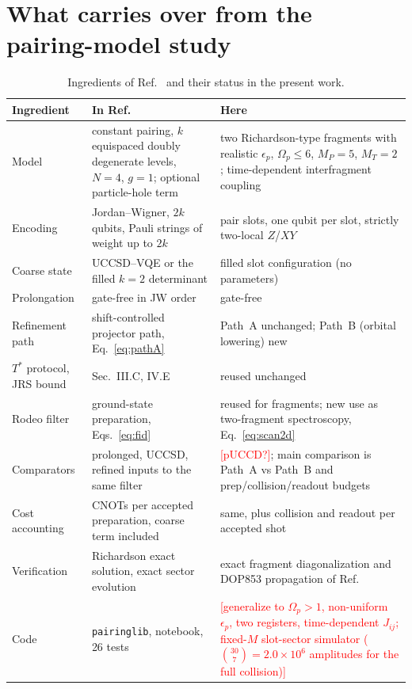 \documentclass[
  aps,
  prc,
  reprint,
  superscriptaddress,
  floatfix,
  nofootinbib
]{revtex4-2}
\newcommand{\todo}[1]{\textcolor{red}{[#1]}}
\begin{document}
\section{What carries over from the pairing-model study}
\label{sec:inherit}
\begin{table}[t]
  \caption{Ingredients of Ref.~\cite{EigenQPairing2026} and their status in
  the present work.}
  \label{tab:inherit}
  \begin{ruledtabular}
  \begin{tabular}{p{}p{}p{}}
  Ingredient & In Ref.~\cite{EigenQPairing2026} & Here \\
  \hline
  Model & constant pairing, $k$ equispaced doubly degenerate levels, $N=4$, $g=1$; optional particle-hole term & two Richardson-type fragments with realistic $\epsilon_p$, $\Omega_p\le6$, $M_P=5$, $M_T=2$; time-dependent interfragment coupling \\
  Encoding & Jordan--Wigner, $2k$ qubits, Pauli strings of weight up to $2k$ & pair slots, one qubit per slot, strictly two-local $Z$/$XY$ \\
  Coarse state & UCCSD--VQE or the filled $k=2$ determinant & filled slot configuration (no parameters) \\
  Prolongation & gate-free in JW order & gate-free \\
  Refinement path & shift-controlled projector path, Eq.~\eqref{eq:pathA} & Path~A unchanged; Path~B (orbital lowering) new \\
  $T^*$ protocol, JRS bound & Sec.~III.C, IV.E & reused unchanged \\
  Rodeo filter & ground-state preparation, Eqs.~\eqref{eq:fid} & reused for fragments; new use as two-fragment spectroscopy, Eq.~\eqref{eq:scan2d} \\
  Comparators & prolonged, UCCSD, refined inputs to the same filter & \todo{pUCCD?}; main comparison is Path~A vs Path~B and prep/collision/readout budgets \\
  Cost accounting & CNOTs per accepted preparation, coarse term included & same, plus collision and readout per accepted shot \\
  Verification & Richardson exact solution, exact sector evolution & exact fragment diagonalization and DOP853 propagation of Ref.~\cite{TwoFragment2026} \\
  Code & \texttt{pairinglib}, notebook, 26 tests & \todo{generalize to $\Omega_p>1$, non-uniform $\epsilon_p$, two registers, time-dependent $J_{ij}$; fixed-$M$ slot-sector simulator ($\binom{30}{7}=2.0\times10^6$ amplitudes for the full collision)} \\
  \end{tabular}
  \end{ruledtabular}
\end{table}
\end{document}
